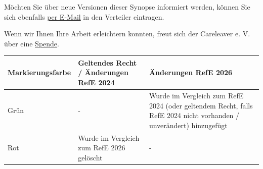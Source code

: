 \documentclass[10pt,a4paper,landscape]{article}
\begin{document}
\begin{center}
\begin{minipage}{25cm}
\par\medskip
M\"ochten Sie \"uber neue Versionen dieser Synopse informiert werden, k\"onnen Sie sich ebenfalls \href{mailto:tamaro.skaljic@careleaver.de?subject=Eintragung\%20in\%20den\%20Verteiler&body=Hiermit\%20stimme\%20ich\%20zu\%2C\%20dass\%20Sie\%20mich\%20per\%20E-Mail\%20\%C3\%BCber\%20neue\%20Versionen\%20der\%20Synopsen\%0D\%0A\%0D\%0A-\%20Vergleich\%20der\%20Referentenentw\%C3\%BCrfe\%202024\%20und\%202026\%0D\%0A\%0D\%0Aund\%0D\%0A\%0D\%0A-\%20Vergleich\%20nur\%20der\%20\%C3\%84nderungen\%20zwischen\%20den\%20Referentenentw\%C3\%BCrfen\%202024\%20und\%202026\%0D\%0A\%0D\%0Ainformieren.\%0D\%0A\%0D\%0AIch\%20wurde\%20dar\%C3\%BCber\%20informiert\%2C\%20dass\%20ich\%20mich\%20jederzeit\%20formlos\%20per\%20E-Mail\%20an\%20tamaro.skaljic\%40careleaver.de\%20aus\%20dem\%20Verteiler\%20austragen\%20kann.}{per E-Mail} in den Verteiler eintragen.
\par\medskip
Wenn wir Ihnen Ihre Arbeit erleichtern konnten, freut sich der Careleaver e. V. \"uber eine \href{https://careleaver.de/spenden/jetzt-spenden/}{Spende}.
\end{minipage}
\end{center}
\vspace{0.3cm}

\begin{center}
\begin{tabular}{|p{2.8cm}|p{6.9cm}|p{13.0cm}|}
\hline
\textbf{Markierungsfarbe} & \textbf{Geltendes Recht / Änderungen RefE 2024} & \textbf{Änderungen RefE 2026} \\
\hline
\textcolor{diffgreen}{Grün} & - & Wurde im Vergleich zum RefE 2024 (oder geltendem Recht, falls RefE 2024 nicht vorhanden / unverändert) hinzugefügt \\
\hline
\textcolor{diffred}{Rot} & Wurde im Vergleich zum RefE 2026 gelöscht & - \\
\hline
\end{tabular}
\end{center}
\vspace{0.5cm}
\end{document}
